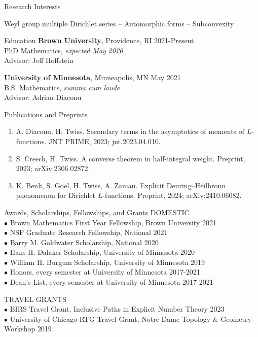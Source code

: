 \documentclass{resume} %
\begin{document}
\begin{rSection}{Research Interests}
    \begin{center}Weyl group multiple Dirichlet series -- Automorphic forms -- Subconvexity\end{center}
\end{rSection}

\begin{rSection}{Education}
    {\bf Brown University}, Providence, RI \hfill {2021-Present} \\
    PhD Mathematics, \textit{expected May 2026} \\
    \hphantom{\quad}Advisor: Jeff Hoffstein

    {\bf University of Minnesota}, Minneapolis, MN \hfill {May 2021} \\
    B.S. Mathematics, \textit{summa cum laude} \\
    \hphantom{\quad}Advisor: Adrian Diaconu
\end{rSection}

\begin{rSection}{Publications and Preprints}
    \begin{enumerate}
        \item {A. Diaconu, H. Twiss. Secondary terms in the asymptotics of moments of $L$-functions. JNT PRIME, 2023; jnt.2023.04.010.}
        \item {S. Creech, H. Twiss. A converse theorem in half-integral weight. Preprint, 2023; arXiv:2306.02872.}
        \item {K. Benli, S. Goel, H. Twiss, A. Zaman. Explicit Deuring–Heilbronn phenomenon for Dirichlet $L$-functions. Preprint, 2024; arXiv:2410.06082.}
    \end{enumerate}
\end{rSection}

\begin{rSection}{Awards, Scholarships, Fellowships, and Grants}
    DOMESTIC \\
    {$\bullet$ Brown Mathematics First Year Fellowship, Brown University} \hfill {2021} \\
    {$\bullet$ NSF Graduate Research Fellowship, National} \hfill {2021} \\
    {$\bullet$ Barry M. Goldwater Scholarship, National} \hfill {2020} \\
    {$\bullet$ Hans H. Dalaker Scholarship, University of Minnesota} \hfill {2020} \\
    {$\bullet$ William H. Burgum Scholarship, University of Minnesota} \hfill {2019} \\
    {$\bullet$ Honors, every semester at University of Minnesota} \hfill {2017-2021} \\
    {$\bullet$ Dean's List, every semester at University of Minnesota} \hfill {2017-2021}

    TRAVEL GRANTS \\
    {$\bullet$ BIRS Travel Grant, Inclusive Paths in Explicit Number Theory} \hfill {2023} \\
    {$\bullet$ University of Chicago RTG Travel Grant, Notre Dame Topology \& Geometry Workshop} \hfill {2019} 
\end{rSection}
\end{document}
